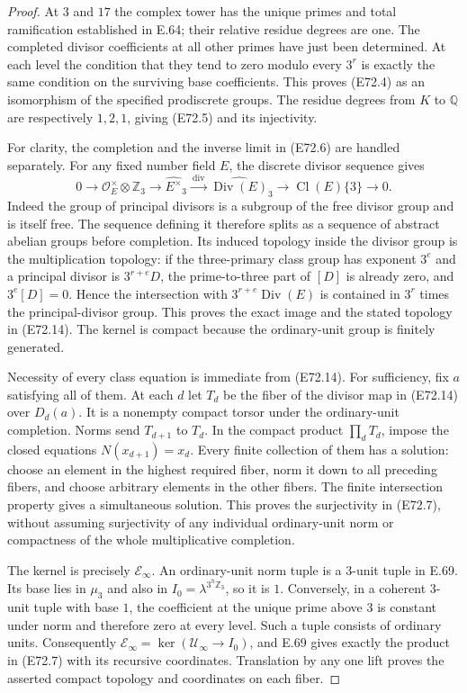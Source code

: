 \begin{proof}
At $3$ and $17$ the complex tower has the unique primes and
total ramification established in E.64; their relative residue
degrees are one. The completed divisor coefficients at all
other primes have just been determined. At each level the
condition that they tend to zero modulo every $3^r$ is exactly
the same condition on the surviving base coefficients.
This proves (E72.4) as an isomorphism of the specified
prodiscrete groups. The residue degrees from $K$ to $\mathbb Q$
are respectively $1,2,1$, giving (E72.5) and its injectivity.

For clarity, the completion and the inverse limit in (E72.6)
are handled separately. For any fixed number field $E$, the
discrete divisor sequence gives
\[
 0\longrightarrow
    \mathcal O_E^\times\otimes\mathbb Z_3
 \longrightarrow \widehat{E^\times}_3
 \xrightarrow{\ \operatorname{div}\ }
    \widehat{\operatorname{Div}(E)}_3
 \longrightarrow \operatorname{Cl}(E)\{3\}
 \longrightarrow0.
 \tag{E72.14}
\]
Indeed the group of principal divisors is a subgroup of the
free divisor group and is itself free. The sequence defining
it therefore splits as a sequence of abstract abelian groups
before completion. Its induced topology inside the divisor
group is the multiplication topology: if the three-primary
class group has exponent $3^e$ and a principal divisor is
$3^{r+e}D$, the prime-to-three part of $[D]$ is already zero,
and $3^e[D]=0$. Hence the intersection with
$3^{r+e}\operatorname{Div}(E)$ is contained in $3^r$ times
the principal-divisor group. This proves
the exact image and the stated topology in (E72.14).
The kernel is compact because the ordinary-unit group is
finitely generated.

Necessity of every class equation is immediate from (E72.14).
For sufficiency, fix $a$ satisfying all of them. At each $d$
let $T_d$ be the fiber of the divisor map in (E72.14) over
$D_d(a)$. It is a nonempty compact torsor under the ordinary-unit
completion. Norms send $T_{d+1}$ to $T_d$.
In the compact product $\prod_dT_d$, impose the closed
equations $N(x_{d+1})=x_d$. Every finite collection of them
has a solution: choose an element in the highest required
fiber, norm it down to all preceding fibers, and choose
arbitrary elements in the other fibers. The finite intersection
property gives a simultaneous solution. This proves the
surjectivity in (E72.7), without assuming surjectivity of
any individual ordinary-unit norm or compactness of the
whole multiplicative completion.

The kernel is precisely $\mathcal E_\infty$. An ordinary-unit
norm tuple is a $3$-unit tuple in E.69. Its base lies in
$\mu_3$ and also in
$I_0=\lambda^{3^h\mathbb Z_3}$, so it is $1$.
Conversely, in a coherent $3$-unit tuple with base $1$,
the coefficient at the unique prime above $3$ is constant
under norm and therefore zero at every level. Such a tuple
consists of ordinary units. Consequently
$\mathcal E_\infty=\ker(\mathcal U_\infty\to I_0)$,
and E.69 gives exactly the product in (E72.7) with its
recursive coordinates. Translation by any one lift proves
the asserted compact topology and coordinates on each fiber.


\end{proof}
